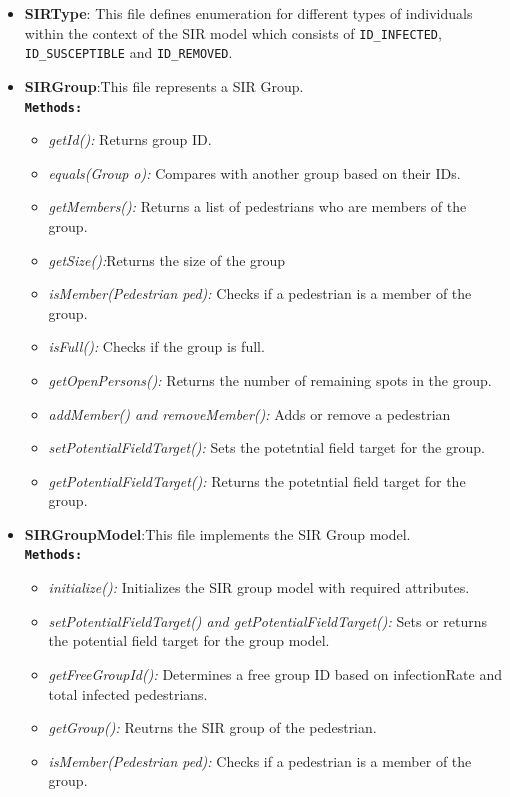 \begin{itemize}
\item \textbf{SIRType}: This file defines enumeration for different types of individuals within the context of the SIR model which consists of \texttt{ID\_INFECTED}, \texttt{ID\_SUSCEPTIBLE} and \texttt{ID\_REMOVED}.
\item \textbf{SIRGroup}:This file represents a SIR Group. \\
\textbf{\texttt{{Methods:}}}
\begin{itemize}
    \item \textit{getId():} Returns group ID.
    \item \textit{equals(Group o):} Compares with another group based on their IDs.
    \item \textit{getMembers():} Returns a list of pedestrians who are members of the group.
    \item \textit{getSize():}Returns the size of the group
    \item \textit{isMember(Pedestrian ped):} Checks if a pedestrian is a member of the group.
    \item \textit{isFull():} Checks if the group is full.
    \item \textit{getOpenPersons():} Returns the number of remaining spots in the group.
    \item \textit{addMember() and removeMember():} Adds or remove a pedestrian
    \item \textit{setPotentialFieldTarget():} Sets the potetntial field target for the group.
    \item \textit{getPotentialFieldTarget():} Returns the potetntial field target for the group.
\end{itemize}
\item \textbf{SIRGroupModel}:This file implements the SIR Group model. \\
\textbf{\texttt{{Methods:}}}
\begin{itemize}
    \item \textit{initialize():} Initializes the SIR group model with required attributes.
    \item \textit{setPotentialFieldTarget() and getPotentialFieldTarget():} Sets or returns the potential field target for the group model.
    \item \textit{getFreeGroupId():} Determines a free group ID based on infectionRate and total infected pedestrians.
    \item \textit{getGroup():} Reutrns the SIR group of the pedestrian. 
    \item \textit{isMember(Pedestrian ped):} Checks if a pedestrian is a member of the group.

\end{itemize}
\end{itemize}
